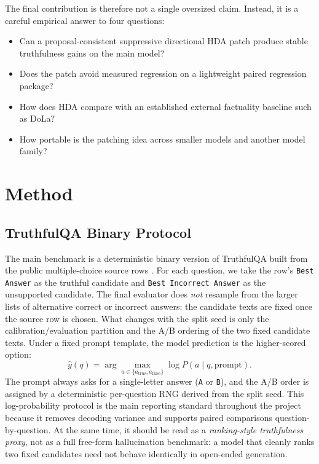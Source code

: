 \documentclass{article}
\begin{document}
The final contribution is therefore not a single oversized claim. Instead, it is a careful empirical answer to four questions:
\begin{itemize}
\item Can a proposal-consistent suppressive directional HDA patch produce stable truthfulness gains on the main model?
\item Does the patch avoid measured regression on a lightweight paired regression package?
\item How does HDA compare with an established external factuality baseline such as DoLa?
\item How portable is the patching idea across smaller models and another model family?
\end{itemize}

\section{Method}
\subsection{TruthfulQA Binary Protocol}
The main benchmark is a deterministic binary version of TruthfulQA built from the public multiple-choice source rows \citep{lin-etal-2022-truthfulqa}. For each question, we take the row's \texttt{Best Answer} as the truthful candidate and \texttt{Best Incorrect Answer} as the unsupported candidate. The final evaluator does \emph{not} resample from the larger lists of alternative correct or incorrect answers: the candidate texts are fixed once the source row is chosen. What changes with the split seed is only the calibration/evaluation partition and the A/B ordering of the two fixed candidate texts. Under a fixed prompt template, the model prediction is the higher-scored option:
\[
\hat{y}(q) = \arg\max_{a \in \{a_{\text{true}}, a_{\text{false}}\}} \log P(a \mid q, \text{prompt}).
\]
The prompt always asks for a single-letter answer (\texttt{A} or \texttt{B}), and the A/B order is assigned by a deterministic per-question RNG derived from the split seed. This log-probability protocol is the main reporting standard throughout the project because it removes decoding variance and supports paired comparisons question-by-question. At the same time, it should be read as a \emph{ranking-style truthfulness proxy}, not as a full free-form hallucination benchmark: a model that cleanly ranks two fixed candidates need not behave identically in open-ended generation.
\end{document}
